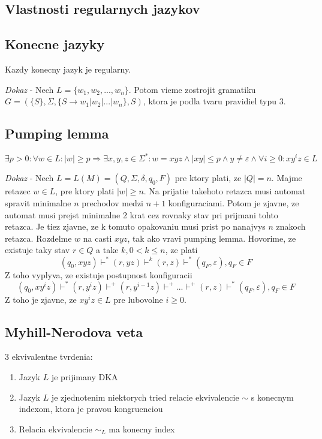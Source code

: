 \documentclass[12pt]{article}
\begin{document}
\subsection*{Vlastnosti regularnych jazykov}
\subsection*{Konecne jazyky}
Kazdy konecny jazyk je regularny.

\emph{Dokaz} - Nech $L = \{w_{1}, w_{2}, ..., w_{n}\}$. Potom vieme zostrojit gramatiku
$G = (\{S\}, \Sigma, \{S \to w_{1}|w_{2}|...|w_{n}\}, S)$, ktora je podla tvaru pravidiel typu 3.

\subsection*{Pumping lemma}
\begin{equation*}
\exists p > 0: \forall w \in L: |w| \ge p \Rightarrow \exists x,y,z \in \Sigma^{*}: w = xyz \land |xy| \le p \land y \not= \varepsilon \land
	\forall i \ge 0: xy^{i}z \in L
\end{equation*}

\emph{Dokaz} - Nech $L = L(M) = (Q, \Sigma, \delta, q_{0}, F)$ pre ktory plati, ze $|Q| = n$. Majme
retazec $w \in L$, pre ktory plati $|w| \ge n$. Na prijatie takehoto retazca musi automat spravit minimalne
$n$ prechodov medzi $n + 1$ konfiguraciami. Potom je zjavne, ze automat musi prejst minimalne
2 krat cez rovnaky stav pri prijmani tohto retazca. Je tiez zjavne, ze k tomuto opakovaniu musi prist
po nanajvys $n$ znakoch retazca. Rozdelme $w$ na casti $xyz$, tak ako vravi pumping lemma.
Hovorime, ze existuje taky stav $r \in Q$ a take $k, 0 < k \le n$, ze plati
\begin{equation*}
	(q_{0}, xyz) \vdash^{*} (r, yz) \vdash^{k} (r, z) \vdash^{*} (q_{F}, \varepsilon), q_{F} \in F
\end{equation*}
Z toho vyplyva, ze existuje postupnost konfiguracii
\begin{equation*}
	(q_{0}, xy^{i}z) \vdash^{*} (r, y^{i}z) \vdash^{+}(r, y^{i - 1}z) \vdash^{+} ... \vdash^{+} (r, z) \vdash^{*} (q_{F}, \varepsilon), q_{F} \in F
\end{equation*}
Z toho je zjavne, ze $xy^{i}z \in L$ pre lubovolne $i \ge 0$.

\subsection*{Myhill-Nerodova veta}
3 ekvivalentne tvrdenia:
\begin{enumerate}
	\item Jazyk $L$ je prijimany DKA
	\item Jazyk $L$ je zjednotenim niektorych tried relacie ekvivalencie $\sim$ s konecnym indexom, ktora je pravou kongruenciou
	\item Relacia ekvivalencie $\sim_{L}$ ma konecny index
\end{enumerate}
\end{document}
